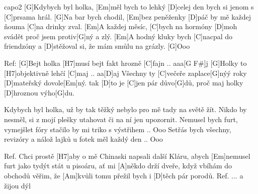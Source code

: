 \hfill capo2
[G]Kdybych byl holka, [Em]měl bych to lehký
[D]celej den bych si jenom s [C]prsama hrál.
[G]Na bar bych chodil, [Em]bez peněženky
[D]páč by mě každej ňouma [C]na drinky zval.
[Em]A každej měsíc, [C]bych na hormóny
[D]moh svádět proč jsem protiv[G]ný a zlý.
[Em]A hodný kluky bych [C]nacpal do friendzóny
a [D]stěžoval si, že mám smůlu na grázly.
[G]Ooo

Ref:
[G]Bejt holka [H7]musí bejt fakt hrozně [C]fajn .. aaa[G F#]j
[G]Holky to [H7]objektivně lehčí [C]maj .. aa[D]aj
Všechny ty [C]večeře zaplace[G]nýý
roky [D]mateřský dovole[Em]ný. tak [D]to je
[C]jen pár důvo[G]dů, proč maj holky [D]hroznou výho[G]du.

Kdybych byl holka, už by tak těžký
nebylo pro mě tady na světě žít.
Nikdo by nesměl, si z mojí plešky
utahovat či na ní jen upozornit.
Nemusel bych furt, vymejšlet fóry
stačilo by mi triko s výstřihem .. Ooo
Setřás bych všechny, revizóry
a nálož lajků u fotek měl každý den .. Ooo

Ref.
Chci prostě [H7]aby o mě Chinaski napsali další Kláru,
abych [Em]nemusel furt jako tydýt stát u pisoáru,
ať mi [A]někdo drží dveře, když vbíhám do obchodů
věřim, že [Am]kvůli tomu přežil bych i [D]těch pár porodů.
Ref. ... a žijou dýl